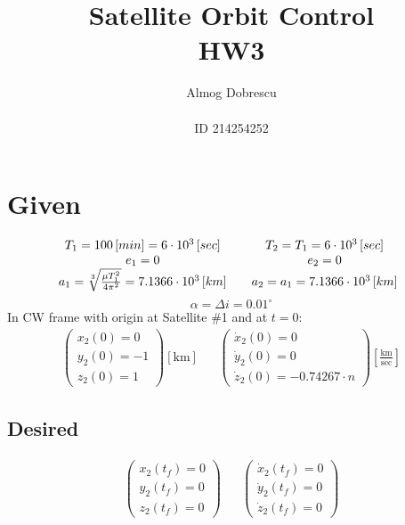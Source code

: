 \documentclass[11pt, a4paper]{article}
\title{Satellite Orbit Control \\ HW3}
\author{Almog Dobrescu\\\\ID 214254252}
\begin{document}
\maketitle

\thispagestyle{empty}
\newpage
\setcounter{page}{1}

\tableofcontents
\vfil
\listoffigures
\newpage

\section{Given}
\begin{equation*}
    \begin{matrix}
        T_1=100\left[min\right] = 6\cdot10^3\left[sec\right] && T_2 = T_1 = 6\cdot10^3\left[sec\right] \\
        e_1 = 0 && e_2 = 0 \\
        a_1 = \sqrt[3]{\frac{\mu T_1^2}{4\pi^2}} = 7.1366\cdot10^3\left[km\right] && a_2 = a_1 = 7.1366\cdot10^3\left[km\right]
    \end{matrix}\\
\end{equation*}
\begin{equation*}
    \alpha=\Delta i = 0.01^\circ
\end{equation*}
In CW frame with origin at Satellite \#1 and at $t=0$:
\begin{equation*}
    \begin{matrix}
    \begin{pmatrix}
        x_2(0)=0 \\ y_2(0)=-1 \\ z_2(0)=1
    \end{pmatrix}\left[\mathrm{km}\right] &&
    \begin{pmatrix}
        \dot{x}_2(0)=0 \\ \dot{y}_2(0) =0 \\ \dot{z}_2(0)=-0.74267\cdot n
    \end{pmatrix}\displaystyle\left[\frac{\mathrm{km}}{\mathrm{sec}}\right]
    \end{matrix}
\end{equation*}

\subsection{Desired}
\begin{equation*}
    \begin{matrix}
    \begin{pmatrix}
        x_2(t_f)=0 \\ y_2(t_f)=0 \\ z_2(t_f)=0
    \end{pmatrix} &&
    \begin{pmatrix}
        \dot{x}_2(t_f)=0 \\ \dot{y}_2(t_f)=0 \\ \dot{z}_2(t_f)=0
    \end{pmatrix}
    \end{matrix}
\end{equation*}
\end{document}
